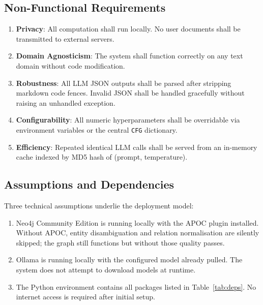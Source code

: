 \subsection{Non-Functional Requirements}

\begin{enumerate}
    \item[\textbf{NFR1}] \textbf{Privacy}: All computation shall run locally.
    No user documents shall be transmitted to external servers.

    \item[\textbf{NFR2}] \textbf{Domain Agnosticism}: The system shall function
    correctly on any text domain without code modification.

    \item[\textbf{NFR3}] \textbf{Robustness}: All LLM JSON outputs shall be
    parsed after stripping markdown code fences. Invalid JSON shall be handled
    gracefully without raising an unhandled exception.

    \item[\textbf{NFR4}] \textbf{Configurability}: All numeric hyperparameters
    shall be overridable via environment variables or the central \texttt{CFG}
    dictionary.

    \item[\textbf{NFR5}] \textbf{Efficiency}: Repeated identical LLM calls shall
    be served from an in-memory cache indexed by MD5 hash of (prompt, temperature).
\end{enumerate}

\subsection{Assumptions and Dependencies}

Three technical assumptions underlie the deployment model:

\begin{enumerate}
    \item Neo4j Community Edition is running locally with the APOC plugin
    installed. Without APOC, entity disambiguation and relation normalisation
    are silently skipped; the graph still functions but without those quality
    passes.
    \item Ollama is running locally with the configured model already pulled.
    The system does not attempt to download models at runtime.
    \item The Python environment contains all packages listed in
    Table~\ref{tab:deps}. No internet access is required after initial setup.
\end{enumerate}

